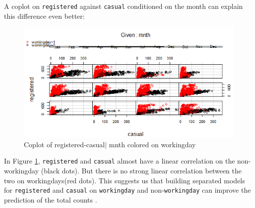 \documentclass[12pt]{article}
\begin{document}
	 A coplot on \texttt{registered} against \texttt{casual} conditioned on the month can explain this difference even better:
	 	\begin{figure}[H]
	 		\centering
	 		\includegraphics[scale=.9]{figures/coplot_registered_casual_mnth.png}
	 		\caption{Coplot of registered-casual$|$ mnth colored on workingday}
	 		\label{fig:registered_casual}
	 	\end{figure}
	In Figure \ref{fig:registered_casual}, \texttt{registered} and \texttt{casual} almost have a linear correlation on the non-workingday (black dots). But there is no strong linear correlation between the two on workingdays(red dots). This suggests us that building separated models for \texttt{registered} and \texttt{casual} on \texttt{workingday} and non-\texttt{workingday} can improve the prediction of the total counts .
	
\end{document}
